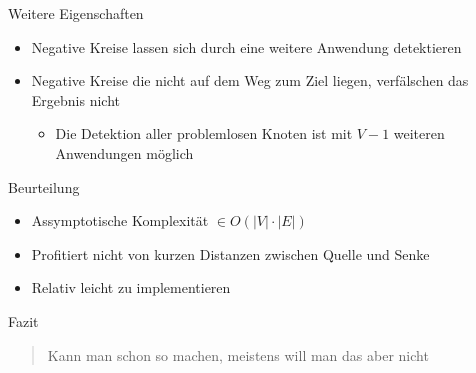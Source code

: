 \begin{frame}{Weitere Eigenschaften}

\begin{itemize}
\itemsep1pt\parskip0pt
\item
  Negative Kreise lassen sich durch eine weitere Anwendung detektieren
\item
  Negative Kreise die nicht auf dem Weg zum Ziel liegen, verfälschen das
  Ergebnis nicht

  \begin{itemize}
  \itemsep1pt\parskip0pt
  \item
    Die Detektion aller problemlosen Knoten ist mit $V - 1$ weiteren
    Anwendungen möglich
  \end{itemize}
\end{itemize}

\end{frame}

\begin{frame}{Beurteilung}

\begin{itemize}
\itemsep1pt\parskip0pt
\item
  Assymptotische Komplexität $\in O(|V| \cdot |E|)$
\item
  Profitiert nicht von kurzen Distanzen zwischen Quelle und Senke
\item
  Relativ leicht zu implementieren
\end{itemize}

\end{frame}

\begin{frame}{Fazit}

\begin{quote}
Kann man schon so machen, meistens will man das aber nicht
\end{quote}

\end{frame}
